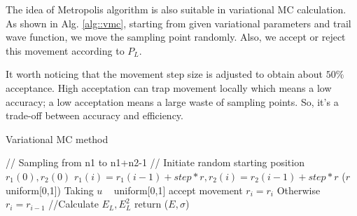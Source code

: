 The idea of Metropolis algorithm is also suitable in  variational MC calculation.
As shown in Alg. \ref{alg::vmc}, starting from given variational parameters and trail wave function, we move the sampling point randomly.
Also, we accept or reject this movement according to $P_L$.

It worth noticing that the movement step size is adjusted to obtain about $50\%$ acceptance. 
High acceptation can trap movement locally which means a low accuracy; a low acceptation means a large waste of sampling points.
So, it's a trade-off between accuracy and efficiency.

\begin{algorithm}[tb]
	\caption{Variational MC method}
	\label{alg::vmc}
    // Sampling from n1 to n1+n2-1\;
    // Initiate random starting position $r_1(0),r_2(0)$ \;
    {$r_1(i) = r_1(i-1)+step*r, r_2(i) = r_2(i-1)+step*r$ ($r$ ~ uniform[0,1])\;
    Taking $u$ ~ uniform[0,1]\;
    {
    accept movement $r_{i}=r_{i}$\;
    }
    Otherwise $r_{i}=r_{i-1}$\;
    }
    //Calculate $E_L,E_L^2 $\;
	return ($E,\sigma$)\;
\end{algorithm}
